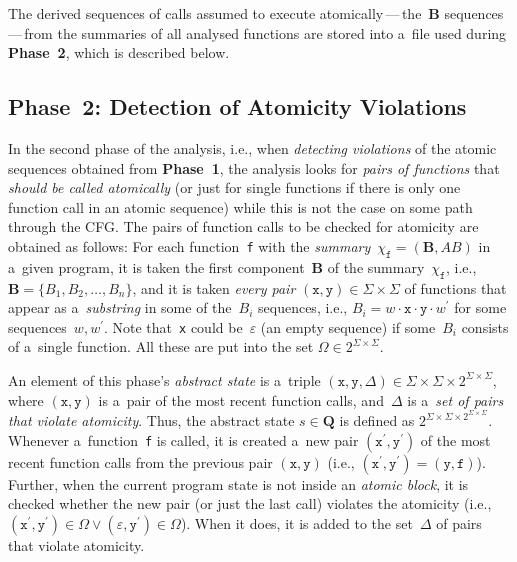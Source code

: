 \documentclass{ExcelAtFIT}
\theoremstyle{definition}
\def\uv#1{\iflanguage{british}{``#1''}{\quotedblbase #1\textquotedblleft}}
\begin{document}
The derived sequences of calls assumed to execute atomically\,---\,the~$ \boldsymbol{B} $ sequences\,---\,from the summaries of all analysed functions are stored into a~file used during \textbf{Phase~2}, which is described below.

\subsection{\hspace{-.35em}Phase~2: Detection of Atomicity Violations}

In the second phase of the analysis, i.e., when \emph{detecting violations} of the atomic sequences obtained from \textbf{Phase~1}, the analysis looks for \emph{pairs of functions} that \emph{should be called atomically} (or just for single functions if there is only one function call in an atomic sequence) while this is not the case on some path through the CFG. The pairs of function calls to be checked for atomicity are obtained as follows: For each function~\texttt{f} with the \emph{summary}~$ \chi_\mathtt{f} = {(\boldsymbol{B}, AB)} $ in a~given program, it is taken the first component~$ \boldsymbol{B} $ of the summary~$ \chi_\mathtt{f} $, i.e., $ \boldsymbol{B} = {\{B_1, B_2, \ldots, B_n\}} $, and it is taken \emph{every pair} $ {(\mathtt{x}, \mathtt{y})} \in \Sigma \times \Sigma $ of functions that appear as a~\emph{substring} in some of the~$ B_i $ sequences, i.e., $ B_i = w \cdot \mathtt{x} \cdot \mathtt{y} \cdot w^\prime $ for some sequences~$ w, w^\prime $. Note that~\texttt{x} could be~$ \varepsilon $ (an empty sequence) if some~$ B_i $ consists of a~single function. All these \uv{atomic pairs} are put into the set $ \Omega \in 2^{\Sigma \times \Sigma} $.

An element of this phase's \emph{abstract state} is a~triple $ {(\mathtt{x}, \mathtt{y}, \Delta)} \in \Sigma \times \Sigma \times 2^{\Sigma \times \Sigma} $, where $ {(\mathtt{x}, \mathtt{y})} $ is a~pair of the most recent function calls, and~$ \Delta $ is a~\emph{set of pairs that violate atomicity}. Thus, the abstract state $ s \in \boldsymbol{Q} $ is defined as $ 2^{\Sigma \times \Sigma \times 2^{\Sigma \times \Sigma}} $. Whenever a~function~\texttt{f} is called, it is created a~new pair ${ (\mathtt{x}^\prime, \mathtt{y}^\prime) }$ of the most recent function calls from the previous pair ${ (\mathtt{x}, \mathtt{y}) }$ (i.e., $ {(\mathtt{x}^\prime, \mathtt{y}^\prime)} = {(\mathtt{y}, \mathtt{f})} $). Further, when the current program state is not inside an \emph{atomic block}, it is checked whether the new pair (or just the last call) violates the atomicity (i.e., $ {(\mathtt{x}^\prime, \mathtt{y}^\prime)} \in \Omega \vee {(\varepsilon, \mathtt{y}^\prime)} \in \Omega $). When it does, it is added to the set~$ \Delta $ of pairs that violate atomicity.
\end{document}
